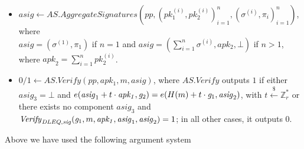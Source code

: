 \begin{construction}
\begin{itemize}
\item $\mathit{asig} \leftarrow \mathit{AS.AggregateSignatures}(\mathit{pp}, (\mathit{pk_1^{(i)}}, \mathit{pk_2^{(i)}})_{i=1}^{n}, (\sigma^{(i)}, \pi_i)_{i=1}^n)$, 
where \\ $\mathit{asig} = (\sigma^{(1)}, \pi_1)$  if $n=1$ and $\mathit{asig} = (\sum_{i=1}^{n} \sigma^{(i)}, \mathit{apk_2}, \bot)$ if $n>1$, where 
$\mathit{apk}_2 = \sum_{i=1}^{n} \mathit{pk_2^{(i)}}$. 

\item $0/1 \leftarrow  \mathit{AS.Verify}(\mathit{pp}, \mathit{apk_1}, m, \mathit{asig})$, where $\mathit{AS.Verify}$ outputs $1$ if either 
$\mathit{asig}_3 = \bot$ and $e(\mathit{asig}_1 + t \cdot \mathit{apk_1}, \mathit{g}_{2}) = e(H(m) + t \cdot \mathit{g}_{1}, \mathit{asig}_2)$, 
with $t \xleftarrow{\$} \mathbb{Z}_{r}^{*}$ or there exists no component $\mathit{asig}_3$ and \\
$\mathit{Verify}_{\mathit{DLEQ}, \mathit{sig}}(\mathit{g}_{1}, m, \mathit{apk_1}, \mathit{asig}_1, \mathit{asig}_2) = 1$; in all other cases, it outputs $0$. 
\end{itemize}
Above we have used the following argument system %
\begin{comment}
$$ \PSpk = (\Genpk, \Provpk, \Veripk) \ \ \ \ (1)$$ where 
\begin{itemize}
\item $(\GoneBLS, \goneBLS, \GtwoBLS, \gtwoBLS, \Hpk) \leftarrow \Genpk(\lambda)$ as a subprotocol of $\mathit{AS.Setup}(\lambda)$. 

\item $\pipk = (c,s) \leftarrow \Provpk(\goneBLS, \gtwoBLS, \mathit{pk_1}, \mathit{pk_2}, \mathit{sk})$ where \\ $k \xleftarrow{\$} \mathbb{Z}_{r}^{*}$, $A =k \cdot \goneBLS$, 
$B=k \cdot  \gtwoBLS$, $c = \Hpk (\goneBLS, \gtwoBLS, \mathit{pk_1}, \mathit{pk_2}, A, B)$, \\ $s = k - c \cdot \mathit{sk} \mod r$. 

\item $0/1 \leftarrow \Veripk(\goneBLS, \gtwoBLS, \mathit{pk_1}, \mathit{pk_2}, (c,s))$, 
where $\Veripk$ outputs 1 if  $c= \Hpk (\goneBLS, \gtwoBLS, \mathit{pk_1}, \mathit{pk_2}, A', B')$
where $A' = s \cdot \goneBLS + c \cdot \mathit{pk_1}$ and $B' = s \cdot \gtwoBLS  + c \cdot \mathit{pk_2}$ and it outputs $0$ otherwise.  
\end{itemize}


\end{comment}
\end{construction}
